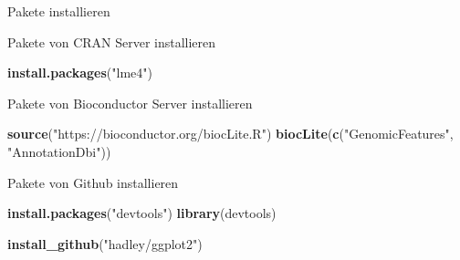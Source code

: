 \documentclass[ignorenonframetext,]{beamer}
\newenvironment{Shaded}{}{}
\newcommand{\KeywordTok}[1]{\textcolor[rgb]{0.00,0.44,0.13}{\textbf{{#1}}}}
\newcommand{\StringTok}[1]{\textcolor[rgb]{0.25,0.44,0.63}{{#1}}}
\newcommand{\NormalTok}[1]{{#1}}
\begin{document}
\begin{frame}[fragile]{Pakete installieren}

\begin{block}{Pakete von CRAN Server installieren}

\begin{Shaded}
\begin{Highlighting}[]
\KeywordTok{install.packages}\NormalTok{(}\StringTok{"lme4"}\NormalTok{)}
\end{Highlighting}
\end{Shaded}

\end{block}

\begin{block}{Pakete von Bioconductor Server installieren}

\begin{Shaded}
\begin{Highlighting}[]
\KeywordTok{source}\NormalTok{(}\StringTok{"https://bioconductor.org/biocLite.R"}\NormalTok{)}
\KeywordTok{biocLite}\NormalTok{(}\KeywordTok{c}\NormalTok{(}\StringTok{"GenomicFeatures"}\NormalTok{, }\StringTok{"AnnotationDbi"}\NormalTok{))}
\end{Highlighting}
\end{Shaded}

\end{block}

\begin{block}{Pakete von Github installieren}

\begin{Shaded}
\begin{Highlighting}[]
\KeywordTok{install.packages}\NormalTok{(}\StringTok{"devtools"}\NormalTok{)}
\KeywordTok{library}\NormalTok{(devtools)}

\KeywordTok{install_github}\NormalTok{(}\StringTok{"hadley/ggplot2"}\NormalTok{)}
\end{Highlighting}
\end{Shaded}

\end{block}

\end{frame}
\end{document}
